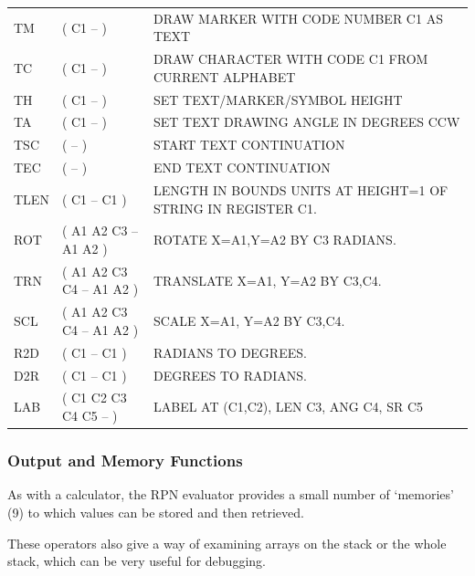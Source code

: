 \documentclass[a4paper,twoside,11pt]{article}
\newcommand{\newpara}{\par\vspace{4mm}\noindent}
\begin{document}
\begin{small}
{\begin{tabular}{|| l | l  | l ||}
TM & ( C1 -- ) & DRAW MARKER WITH CODE NUMBER C1 AS TEXT \\
TC & ( C1 -- ) & DRAW CHARACTER WITH CODE C1 FROM CURRENT ALPHABET \\
TH & ( C1 -- ) & SET TEXT/MARKER/SYMBOL HEIGHT \\
TA & ( C1 -- ) & SET TEXT DRAWING ANGLE IN DEGREES CCW \\
TSC & ( -- ) & START TEXT CONTINUATION \\
TEC & ( -- ) & END TEXT CONTINUATION \\
TLEN & ( C1 -- C1 ) & LENGTH IN BOUNDS UNITS AT HEIGHT=1 OF STRING IN REGISTER C1. \\
ROT & ( A1 A2 C3 -- A1 A2 ) & ROTATE X=A1,Y=A2 BY C3 RADIANS. \\
TRN & ( A1 A2 C3 C4 -- A1 A2 ) & TRANSLATE X=A1, Y=A2 BY C3,C4. \\
SCL & ( A1 A2 C3 C4 -- A1 A2 ) & SCALE X=A1, Y=A2 BY C3,C4. \\
R2D & ( C1 -- C1 ) & RADIANS TO DEGREES. \\
D2R & ( C1 -- C1 ) & DEGREES TO RADIANS. \\
LAB & ( C1 C2 C3 C4 C5 -- ) & LABEL AT (C1,C2), LEN C3, ANG C4, SR C5 \\
\hline
\end{tabular}
}
\end{small}

\subsubsection{Output and Memory Functions}
As with a calculator, the RPN evaluator provides a small number of `memories' (9) to which values can be stored
and then retrieved.
\newpara
These operators also give a way of examining arrays on the stack or the whole stack, which can be very useful for debugging. 
\newpara
{}
\end{document}
